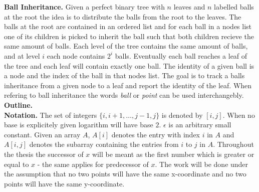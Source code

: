 
\noindent \textbf{Ball Inheritance.} Given a perfect binary tree with $n$ leaves and $n$ labelled balls at the root the idea is to distribute the balls from the root to the leaves. The balls at the root are contained in an ordered list and for each ball in a nodes list one of its children is picked to inherit the ball such that both children recieve the same amount of balls. Each level of the tree contains the same amount of balls, and at level $i$ each node contains $2^i$ balls. Eventually each ball reaches a leaf of the tree and each leaf will contain exactly one ball. The identity of a given ball is a node and the index of the ball in that nodes list. The goal is to track a balls inheritance from a given node to a leaf and report the identity of the leaf. When refering to ball inheritance the words \emph{ball} or \emph{point} can be used interchangebly. \\


\noindent \textbf{Outline.} \\

\noindent \textbf{Notation.} The set of integers $\{i, i+1, \dots, j-1, j\}$ is denoted by $[i,j]$. When no base is explicitely given logarithm will have base $2$. $\epsilon$ is an arbitrary small constant. Given an array $A$, $A[i]$ denotes the entry with index $i$ in $A$ and $A[i,j]$ denotes the subarray containing the entries from $i$ to $j$ in $A$. Throughout the thesis the successor of $x$ will be meant as the first number which is greater or equal to $x$ - the same applies for predecessor of $x$. The work will be done under the assumption that no two points will  have the same x-coordinate and no two points will have the same y-coordinate. 


